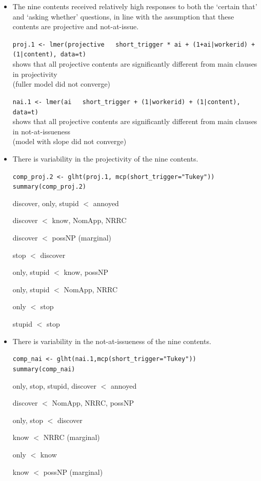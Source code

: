 \documentclass[11pt,fleqn]{article}
\newcommand{\6}{\mbox{$[\hspace*{-.6mm}[$}}
\newcommand{\9}{\mbox{$]\hspace*{-.6mm}]$}}
\begin{document}
\begin{itemize}

\item The nine contents received relatively high responses to both the `certain that' and `asking whether' questions, in line with the assumption that these contents are projective and not-at-issue. 

{\tt proj.1 <- lmer(projective ~ short\_trigger * ai + (1+ai|workerid) + (1|content), data=t)}
\\ shows that all projective contents are significantly different from main clauses in projectivity
\\ (fuller model did not converge)

{\tt nai.1 <- lmer(ai ~ short\_trigger + (1|workerid) + (1|content), data=t)}
\\ shows that all projective contents are significantly different from main clauses in not-at-issueness
\\ (model with slope did not converge)

\item There is variability in the projectivity of the nine contents.

{\tt comp\_proj.2 <- glht(proj.1, mcp(short\_trigger="Tukey"))
\\summary(comp\_proj.2)}

discover, only, stupid $<$ annoyed

discover $<$ know, NomApp, NRRC

discover $<$ possNP (marginal)

stop $<$ discover

only, stupid $<$ know, possNP

only, stupid $<$ NomApp, NRRC

only $<$ stop

stupid $<$ stop

\item There is variability in the not-at-issueness of the nine contents.

{\tt comp\_nai <- glht(nai.1,mcp(short\_trigger="Tukey"))
\\ summary(comp\_nai)}

only, stop, stupid, discover $<$ annoyed

discover $<$ NomApp, NRRC, possNP

only, stop $<$ discover

know $<$ NRRC (marginal)

only $<$ know

know $<$ possNP (marginal)


\end{itemize}
\end{document}
